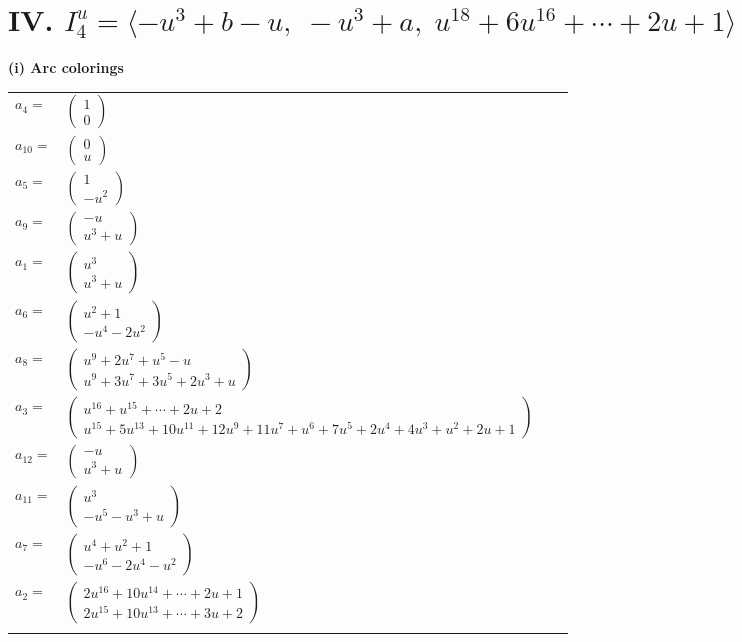 \documentclass[1p]{elsarticle_modified}
\theoremstyle{definition}
\begin{document}
\centering \section*{IV. $I^u_{4}= \langle - u^3+b- u,\;- u^3+a,\;u^{18}+6 u^{16}+\cdots+2 u+1 \rangle$}
\flushleft \textbf{(i) Arc colorings}\\
\begin{tabular}{m{7pt} m{180pt} m{7pt} m{180pt} }
\flushright $a_{4}=$&$\begin{pmatrix}1\\0\end{pmatrix}$ \\
\flushright $a_{10}=$&$\begin{pmatrix}0\\u\end{pmatrix}$ \\
\flushright $a_{5}=$&$\begin{pmatrix}1\\- u^2\end{pmatrix}$ \\
\flushright $a_{9}=$&$\begin{pmatrix}- u\\u^3+u\end{pmatrix}$ \\
\flushright $a_{1}=$&$\begin{pmatrix}u^3\\u^3+u\end{pmatrix}$ \\
\flushright $a_{6}=$&$\begin{pmatrix}u^2+1\\- u^4-2 u^2\end{pmatrix}$ \\
\flushright $a_{8}=$&$\begin{pmatrix}u^9+2 u^7+u^5- u\\u^9+3 u^7+3 u^5+2 u^3+u\end{pmatrix}$ \\
\flushright $a_{3}=$&$\begin{pmatrix}u^{16}+u^{15}+\cdots+2 u+2\\u^{15}+5 u^{13}+10 u^{11}+12 u^9+11 u^7+u^6+7 u^5+2 u^4+4 u^3+u^2+2 u+1\end{pmatrix}$ \\
\flushright $a_{12}=$&$\begin{pmatrix}- u\\u^3+u\end{pmatrix}$ \\
\flushright $a_{11}=$&$\begin{pmatrix}u^3\\- u^5- u^3+u\end{pmatrix}$ \\
\flushright $a_{7}=$&$\begin{pmatrix}u^4+u^2+1\\- u^6-2 u^4- u^2\end{pmatrix}$ \\
\flushright $a_{2}=$&$\begin{pmatrix}2 u^{16}+10 u^{14}+\cdots+2 u+1\\2 u^{15}+10 u^{13}+\cdots+3 u+2\end{pmatrix}$\\&\end{tabular}
\end{document}
